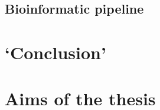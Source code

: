     \subsection{Bioinformatic pipeline}

\begin{comment}
\begin{itemize}
            \item{Different samples}
            \item{Technology: wet lab but also software: Rupgrade, \ldots}
            \item{missing meta-data}
        \end{itemize}
    \subsection{Main concerns}
        \subsubsection{Detection}
        \subsubsection{Quantification}
    \subsection{Consistency through biological layers}
\end{comment}





\section{`Conclusion'}

\begin{comment}
\Rnaseq\ as \Dnaseq\ needs many corrections as to prevent biases in the downstream
analysis. However, due to the dynamic component of the transcriptome
contrarily to the genome, while it is possible to apply the corrections in
\Dnaseq\ and then analyse the data \mycite{dnaseqCorr},
in \Rnaseq, corrections are already part of
the analysis and requires often as much skills than flair. It is possible that
future protocols will overcome this issue.
\end{comment}

\section{Aims of the thesis}

